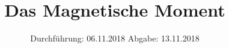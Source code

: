

\subject{V105}
\title{Das Magnetische Moment}
\date{%
  Durchführung: 06.11.2018
  \hspace{3em}
  Abgabe: 13.11.2018
}



\maketitle
\thispagestyle{empty}
\tableofcontents
\newpage







\printbibliography{}


